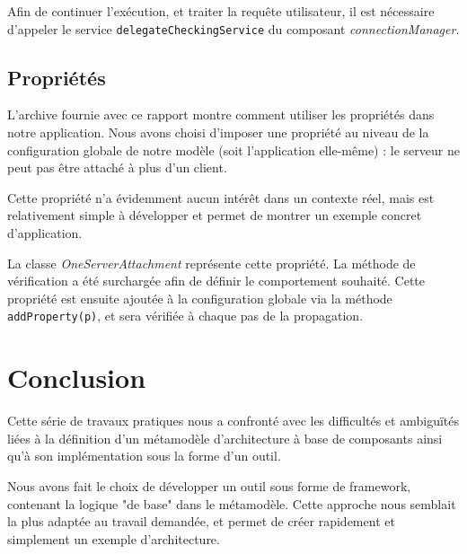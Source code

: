         Afin de continuer l'exécution, et traiter la requête utilisateur, il est nécessaire d'appeler le service \lstinline{delegateCheckingService} du composant \emph{connectionManager}.
        
	\section{Propriétés}
    	L'archive fournie avec ce rapport montre comment utiliser les propriétés dans notre application. Nous avons choisi d'imposer une propriété au niveau de la configuration globale de notre modèle (soit l'application elle-même) : le serveur ne peut pas être attaché à plus d'un client.
        
        Cette propriété n'a évidemment aucun intérêt dans un contexte réel, mais est relativement simple à développer et permet de montrer un exemple concret d'application.
        \newline
        
        La classe \emph{OneServerAttachment} représente cette propriété. La méthode de vérification a été surchargée afin de définir le comportement souhaité. Cette propriété est ensuite ajoutée à la configuration globale via la méthode \lstinline{addProperty(p)}, et sera vérifiée à chaque pas de la propagation.

\chapter*{Conclusion}
	Cette série de travaux pratiques nous a confronté avec les difficultés et ambiguïtés liées à la définition d'un métamodèle d'architecture à base de composants ainsi qu'à son implémentation sous la forme d'un outil.
    \newline
    
    Nous avons fait le choix de développer un outil sous forme de framework, contenant la logique "de base" dans le métamodèle. Cette approche nous semblait la plus adaptée au travail demandée, et permet de créer rapidement et simplement un exemple d'architecture.
    \newline
    

